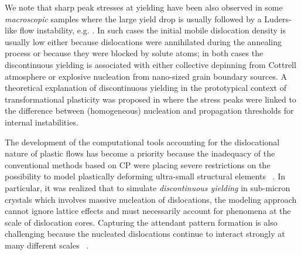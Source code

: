 \documentclass[CRPHYS,Unicode,manuscript]{cedram}
\begin{document}
 We note that  sharp  peak stresses  at yielding  have been also observed in some  \emph{macroscopic}   samples where the large yield drop is usually followed by a Luders-like flow instability,  e.g. \cite{Li2002-tw, Ruan2019-bx}. 
In such cases  the initial mobile dislocation density   is usually  low  either because  dislocations  were annihilated during the annealing process   or  because  they were  blocked by  solute atoms;  in both cases  the discontinuous yielding is  associated with  either collective depinning   from Cottrell atmosphere  or explosive   nucleation   from  nano-sized grain boundary sources. 
  A theoretical explanation of discontinuous yielding in the prototypical context of transformational plasticity was proposed in \cite{Truskinovsky2004-xp} where the stress peaks were linked  to the difference between (homogeneous) nucleation and propagation thresholds for internal instabilities.
  



 
 
 

The development of the  computational  tools   accounting for the dislocational nature  of plastic flows has  become a priority  because the inadequacy of the conventional methods  based on CP were  placing severe restrictions    on the possibility to model plastically deforming ultra-small structural elements  ~\cite{Zheng2010-ag,Zhang2017-cg,Wang2018-fk,Parakh2020-mk}.  In particular, it was realized that to simulate \emph{discontinuous yielding} in sub-micron crystals  which   involves  massive nucleation of dislocations,  the   modeling approach cannot ignore lattice effects and must  necessarily  account for phenomena at the scale of dislocation  cores.  Capturing the attendant pattern formation   is   also challenging because the nucleated dislocations  continue to  interact strongly at  many different scales
~\cite{Xia2015-vo,Clouet2015-zk,Salvalaglio2019-kt,Van_der_Giessen2020-gl,Bertin2020-hv}. 
\end{document}
